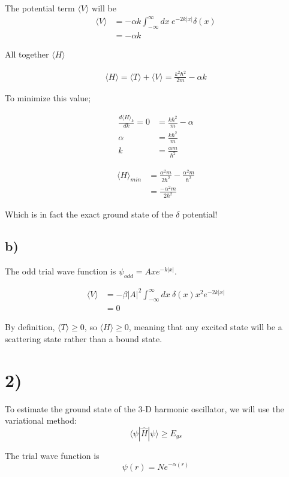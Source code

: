 \documentclass{article}
\newcommand{\braket}[1]{\langle#1\rangle}
\begin{document}
The potential term $\braket{V}$ will be
\begin{align*}
    \braket{V}&=-\alpha{k}\int_{-\infty}^{\infty}dx\:e^{-2k|x|}\delta(x)\\[1em]
    &=-\alpha{k}
\end{align*}

All together $\braket{H}$

\begin{align*}
    \braket{H}=\braket{T}+\braket{V}=\frac{k^2\hbar^2}{2m}-\alpha{k}
\end{align*}

To minimize this value;

\begin{align*}
    \frac{d\braket{H}_k}{dk}=0&=\frac{k\hbar^2}{m}-\alpha\\[1em]
    \alpha&=\frac{k\hbar^2}{m}\\[1em]
    k&=\frac{\alpha{m}}{\hbar^2}
\end{align*}

\begin{align*}
    \braket{H}_{min}&=\frac{\alpha^2m}{2\hbar^2}-\frac{\alpha^2m}{\hbar^2}\\[1em]
    &=\frac{-\alpha^2m}{2\hbar^2}
\end{align*}

Which is in fact the exact ground state of the $\delta$ potential!

\subsection*{b)}
The odd trial wave function is $\psi_{odd}=Axe^{-k|x|}$.

\begin{align*}
    \braket{V}&=-\beta|A|^2\int_{-\infty}^{\infty}dx\:\delta(x)x^2e^{-2k|x|}\\[1em]
    &=0
\end{align*}

By definition, $\braket{T}\geq0$, so $\braket{H}\geq0$, meaning that any excited state will be a scattering state rather than a bound state.
\section*{2)}
To estimate the ground state of the 3-D harmonic oscillator, we will use the variational method:$$\langle\psi|\hat{H}|\psi\rangle\geq{E_{gs}}$$

The trial wave function is $$\psi(r)=Ne^{-\alpha(r)}$$
\end{document}
